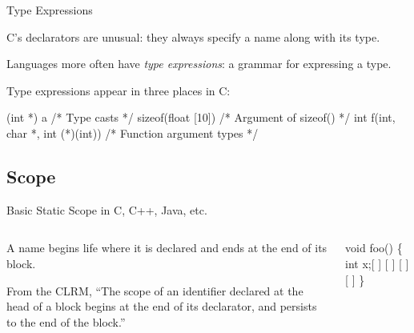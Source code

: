 \documentclass{plt}
\begin{document}
\begin{frame}[fragile]{Type Expressions}

C's declarators are unusual: they always specify a name along with its type. 

Languages more often have \emph{type expressions}: a grammar for
expressing a type.

Type expressions appear in three places in C:

\begin{C}
(int *) a                         /* Type casts */
sizeof(float [10])                /* Argument of sizeof() */
int f(int, char *, int (*)(int))  /* Function argument types */
\end{C}

\end{frame}

\subsection{Scope}

\begin{frame}[fragile]{Basic Static Scope in C, C++, Java, etc.}
  \begin{columns}
    \begin{column}{0.5\textwidth}
\parskip=1pc

A name begins life where it is declared and ends at the end
of its block.

From the CLRM, ``The scope of an identifier declared at the head of a
block begins at the end of its declarator, and persists to the end of
the block.''
    \end{column}
    \begin{column}{0.5\textwidth}
\begin{showscope}
void foo()
\{
   int x;[                 ]
[                          ]
[                          ]
[                          ]
\}%
\end{showscope}
    \end{column}
  \end{columns}
\end{frame}
\end{document}
